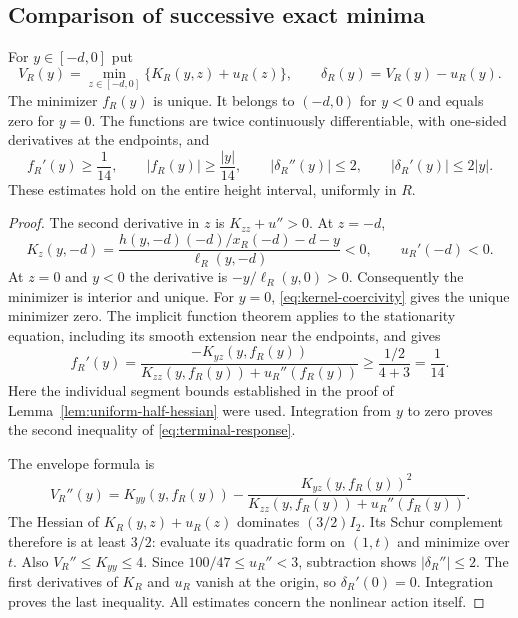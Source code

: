 \subsection{Comparison of successive exact minima}
\begin{lemma}
\label{lem:terminal-response}
For $y\in[-d,0]$ put
\[
 V_R(y)=\min_{z\in[-d,0]}\{K_R(y,z)+u_R(z)\},\qquad
 \delta_R(y)=V_R(y)-u_R(y).
\]
The minimizer $f_R(y)$ is unique. It belongs to $(-d,0)$ for $y<0$
and equals zero for $y=0$. The functions are twice continuously
differentiable, with one-sided derivatives at the endpoints, and
\begin{equation}\label{eq:terminal-response}
 f_R'(y)\ge\frac1{14},\qquad
 |f_R(y)|\ge\frac{|y|}{14},\qquad
 |\delta_R''(y)|\le2,\qquad |\delta_R'(y)|\le2|y|.
\end{equation}
These estimates hold on the entire height interval, uniformly in $R$.
\end{lemma}
\begin{proof}
The second derivative in $z$ is $K_{zz}+u''>0$. At $z=-d$,
\[
 K_z(y,-d)=\frac{h(y,-d)(-d)/x_R(-d)-d-y}{\ell_R(y,-d)}<0,
 \qquad u_R'(-d)<0.
\]
At $z=0$ and $y<0$ the derivative is $-y/\ell_R(y,0)>0$.
Consequently the minimizer is interior and unique. For $y=0$,
\eqref{eq:kernel-coercivity} gives the unique minimizer zero.
The implicit function theorem applies to the stationarity equation,
including its smooth extension near the endpoints, and gives
\[
 f_R'(y)=\frac{-K_{yz}(y,f_R(y))}
                    {K_{zz}(y,f_R(y))+u_R''(f_R(y))}
 \ge\frac{1/2}{4+3}=\frac1{14}.
\]
Here the individual segment bounds established in the proof of
Lemma~\ref{lem:uniform-half-hessian} were used. Integration from $y$
to zero proves the second inequality of \eqref{eq:terminal-response}.

The envelope formula is
\[
 V_R''(y)=K_{yy}(y,f_R(y))-
       \frac{K_{yz}(y,f_R(y))^2}{K_{zz}(y,f_R(y))+u_R''(f_R(y))}.
\]
The Hessian of $K_R(y,z)+u_R(z)$ dominates $(3/2)I_2$.
Its Schur complement therefore is at least $3/2$: evaluate its
quadratic form on $(1,t)$ and minimize over $t$. Also
$V_R''\le K_{yy}\le4$. Since $100/47\le u_R''<3$, subtraction
shows $|\delta_R''|\le2$. The first derivatives of $K_R$ and $u_R$
vanish at the origin, so $\delta_R'(0)=0$. Integration proves the
last inequality. All estimates concern the nonlinear action itself.
\end{proof}

